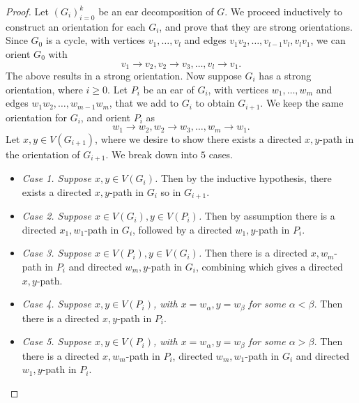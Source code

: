 \documentclass[co342]{subfiles}
\begin{document}
    \begin{proof}
        Let $\left( G_{i} \right)^{k}_{i=0}$ be an ear decomposition of $G$. We proceed inductively to construct an orientation for each $G_i$, and prove that they are strong orientations. Since $G_0$ is a cycle, with vertices $v_1,\ldots,v_l$ and edges $v_1v_2,\ldots,v_{l-1}v_l,v_lv_1$, we can orient $G_0$ with
        \begin{equation*}
            v_1\to v_2, v_2\to v_3, \ldots, v_l\to v_1.
        \end{equation*}
        The above results in a strong orientation. Now suppose $G_i$ has a strong orientation, where $i\geq 0$. Let $P_i$ be an ear of $G_i$, with vertices $w_1,\ldots,w_m$ and edges $w_1w_2,\ldots,w_{m-1}w_m$, that we add to $G_i$ to obtain $G_{i+1}$. We keep the same orientation for $G_i$, and orient $P_i$ as
        \begin{equation*}
            w_1\to w_2, w_2\to w_3, \ldots, w_m\to w_1.
        \end{equation*}
        Let $x,y\in V\left( G_{i+1} \right)$, where we desire to show there exists a directed $x,y$-path in the orientation of $G_{i+1}$. We break down into $5$ cases.
        \begin{itemize}
            \item \textit{Case 1. Suppose $x,y\in V\left( G_i \right)$.} Then by the inductive hypothesis, there exists a directed $x,y$-path in $G_i$ so in $G_{i+1}$.
            \item \textit{Case 2. Suppose $x\in V\left( G_i \right), y\in V\left( P_i \right)$.} Then by assumption there is a directed $x_1,w_1$-path in $G_i$, followed by a directed $w_1,y$-path in $P_i$.
            \item \textit{Case 3. Suppose $x\in V\left( P_i \right), y\in V\left( G_i \right)$.} Then there is a directed $x,w_m$-path in $P_i$ and directed $w_m,y$-path in $G_i$, combining which gives a directed $x,y$-path.
            \item \textit{Case 4. Suppose $x,y\in V\left( P_i \right)$, with $x=w_{\alpha},y=w_{\beta}$ for some $\alpha<\beta$.} Then there is a directed $x,y$-path in $P_i$.
            \item \textit{Case 5. Suppose $x,y\in V\left( P_i \right)$, with $x=w_{\alpha},y=w_{\beta}$ for some $\alpha>\beta$.} Then there is a directed $x,w_m$-path in $P_i$, directed $w_m,w_1$-path in $G_i$ and directed $w_1,y$-path in $P_i$. \qqedsym
        \end{itemize} 
    \end{proof}
\end{document}
